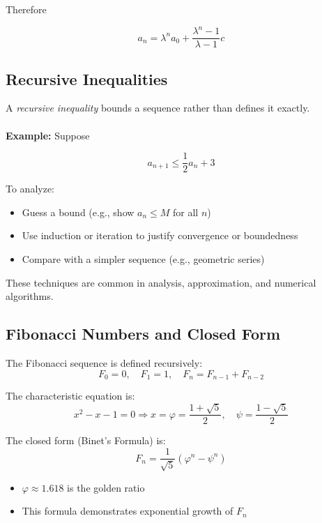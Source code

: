 Therefore

\[a_n = \lambda^n a_0 + \frac{\lambda^n - 1}{\lambda - 1}c\]

\subsection{Recursive Inequalities}

A \emph{recursive inequality} bounds a sequence rather than defines it exactly.
\\\\
\textbf{Example:} Suppose

\[
a_{n+1} \le \frac{1}{2} a_n + 3
\]

To analyze:
\begin{itemize}[label=\(-\)]
    \item Guess a bound (e.g., show \( a_n \le M \) for all \( n \))
    \item Use induction or iteration to justify convergence or boundedness
    \item Compare with a simpler sequence (e.g., geometric series)
\end{itemize}

These techniques are common in analysis, approximation, and numerical algorithms.

\subsection{Fibonacci Numbers and Closed Form}

The Fibonacci sequence is defined recursively:
\[
F_0 = 0, \quad F_1 = 1, \quad F_n = F_{n-1} + F_{n-2}
\]

The characteristic equation is:
\[
x^2 - x - 1 = 0 \Rightarrow x = \varphi = \frac{1 + \sqrt{5}}{2}, \quad \psi = \frac{1 - \sqrt{5}}{2}
\]

The closed form (Binet’s Formula) is:
\[
F_n = \frac{1}{\sqrt{5}} \left( \varphi^n - \psi^n \right)
\]

\begin{itemize}[label=\(-\)]
    \item \( \varphi \approx 1.618 \) is the golden ratio
    \item This formula demonstrates exponential growth of \( F_n \)
\end{itemize}

\newpage
